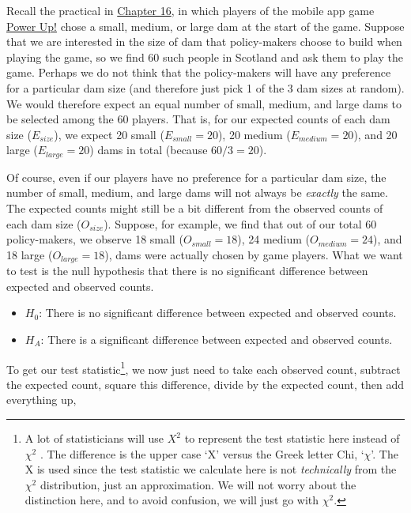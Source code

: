 \documentclass[
]{scrbook}
\providecommand{\tightlist}{%
  \setlength{\itemsep}{0pt}\setlength{\parskip}{0pt}}
\begin{document}
Recall the practical in \protect\hyperlink{Chapter_16}{Chapter 16}, in which players of the mobile app game \href{https://play.google.com/store/apps/details?id=com.hyperluminal.stirlinguniversity.sustainabledevelopmentgame}{Power Up!} chose a small, medium, or large dam at the start of the game.
Suppose that we are interested in the size of dam that policy-makers choose to build when playing the game, so we find 60 such people in Scotland and ask them to play the game.
Perhaps we do not think that the policy-makers will have any preference for a particular dam size (and therefore just pick 1 of the 3 dam sizes at random).
We would therefore expect an equal number of small, medium, and large dams to be selected among the 60 players.
That is, for our expected counts of each dam size (\(E_{size}\)), we expect 20 small (\(E_{small} = 20\)), 20 medium (\(E_{medium} = 20\)), and 20 large (\(E_{large} = 20\)) dams in total (because \(60/3 = 20\)).

Of course, even if our players have no preference for a particular dam size, the number of small, medium, and large dams will not always be \emph{exactly} the same.
The expected counts might still be a bit different from the observed counts of each dam size (\(O_{size}\)).
Suppose, for example, we find that out of our total 60 policy-makers, we observe 18 small (\(O_{small} = 18\)), 24 medium (\(O_{medium} = 24\)), and 18 large (\(O_{large} = 18\)), dams were actually chosen by game players.
What we want to test is the null hypothesis that there is no significant difference between expected and observed counts.

\begin{itemize}
\tightlist
\item
  \(H_{0}\): There is no significant difference between expected and observed counts.
\item
  \(H_{A}\): There is a significant difference between expected and observed counts.
\end{itemize}

To get our test statistic\footnote{A lot of statisticians will use \(X^{2}\) to represent the test statistic here instead of \(\chi^{2}\) \citep{Sokal1995}. The difference is the upper case `X' versus the Greek letter Chi, `\(\chi\)'. The X is used since the test statistic we calculate here is not \emph{technically} from the \(\chi^{2}\) distribution, just an approximation. We will not worry about the distinction here, and to avoid confusion, we will just go with \(\chi^{2}\).}, we now just need to take each observed count, subtract the expected count, square this difference, divide by the expected count, then add everything up,
\end{document}
